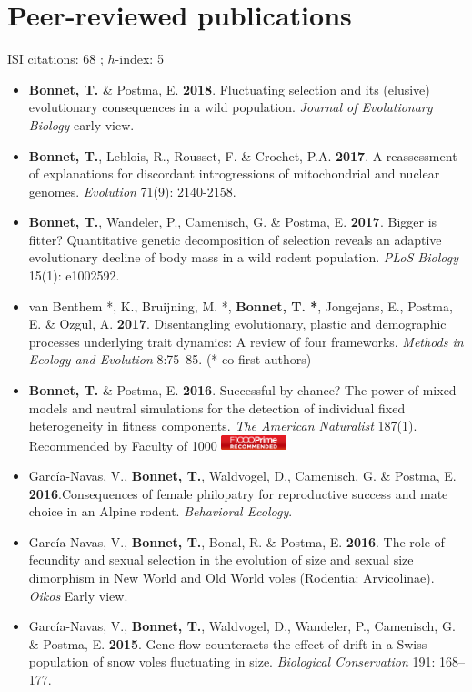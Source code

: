 \documentclass[a4paper,10pt]{article} %
\begin{document}
\section*{Peer-reviewed publications}
ISI citations: 68 ; $h$-index: 5
\vspace{10pt}
\begin{itemize}
\item \textbf{Bonnet, T.} \& Postma, E. \textbf{2018}. Fluctuating selection and its (elusive) evolutionary consequences in a wild population. \textit{Journal of Evolutionary Biology} early view.
\item \textbf{Bonnet, T.}, Leblois, R., Rousset, F. \& Crochet, P.A. \textbf{2017}. A reassessment of explanations for discordant introgressions of mitochondrial and nuclear genomes. \textit{Evolution} 71(9): 2140-2158.
\item \textbf{Bonnet, T.}, Wandeler, P., Camenisch, G. \& Postma, E. \textbf{2017}. Bigger is fitter? Quantitative genetic decomposition of selection reveals an adaptive evolutionary decline of body mass in a wild rodent population. \textit{PLoS Biology} 15(1): e1002592.
\item van Benthem *, K., Bruijning, M. *, \textbf{Bonnet, T. *}, Jongejans, E., Postma, E. \& Ozgul, A. \textbf{2017}. Disentangling evolutionary, plastic and demographic processes underlying trait dynamics: A review of four frameworks. \textit{Methods in Ecology and Evolution} 8:75--85. (* co-first authors) 
\item \textbf{Bonnet, T.} \& Postma, E. \textbf{2016}. Successful by chance? The power of mixed models and neutral simulations for the detection of individual fixed heterogeneity in fitness components. \textit{The American Naturalist} 187(1). {\footnotesize Recommended by Faculty of 1000}
\includegraphics[width=0.15\textwidth]{F1000badge}
\item Garc\'{i}a-Navas, V., \textbf{Bonnet, T.}, Waldvogel, D., Camenisch, G. \& Postma, E. \textbf{2016}.Consequences of female philopatry for reproductive success and mate choice in an Alpine rodent. \textit{Behavioral Ecology}.
\item Garc\'{i}a-Navas, V., \textbf{Bonnet, T.}, Bonal, R. \& Postma, E. \textbf{2016}. The role of fecundity and sexual selection in the evolution of size and sexual size dimorphism in New World and Old World voles (Rodentia: Arvicolinae). \textit{Oikos} Early view.
\item Garc\'{i}a-Navas, V., \textbf{Bonnet, T.}, Waldvogel, D., Wandeler, P., Camenisch, G. \& Postma, E. \textbf{2015}. Gene flow counteracts the effect of drift in a Swiss population of snow voles fluctuating in size. \textit{Biological Conservation} 191: 168--177.

\end{itemize}
\end{document}
